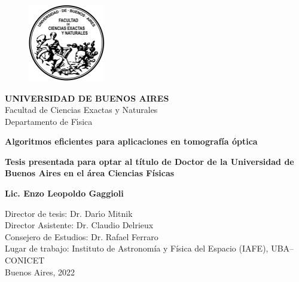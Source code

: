 

\begin{titlepage}
\begin{center}

\begin{figure}[htb]
\center
\includegraphics[width=0.3\textwidth]{figuras/Logo-fcenuba}
\end{figure}
{\bf UNIVERSIDAD DE BUENOS AIRES}\\
Facultad de Ciencias Exactas y Naturales\\
Departamento de F\'{\i}sica

\vspace*{0.5cm}
\begin{Large}
\textbf{Algoritmos eficientes para aplicaciones en tomografía óptica} \\
\end{Large}
\vspace*{0.5cm}
\textbf{Tesis presentada para optar al título de Doctor de la Universidad de 
Buenos Aires en el área Ciencias Físicas}\\

\begin{large}
\textbf{Lic. Enzo Leopoldo Gaggioli}\\
\end{large}

\vspace*{1.0cm}
\begin{flushleft}
Director de tesis: Dr. Dar\'{\i}o Mitnik\\
Director Asistente: Dr. Claudio Delrieux\\
Consejero de Estudios: Dr. Rafael Ferraro\\
\vspace*{0.5cm}
Lugar de trabajo: Instituto de Astronomía y Física del Espacio (IAFE), UBA--CONICET\\
\vspace*{0.5cm}
Buenos Aires, 2022
\end{flushleft}



\end{center}

\end{titlepage}

